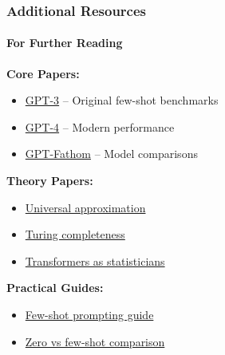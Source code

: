 \documentclass[10pt,aspectratio=169]{beamer}
\begin{document}
\begin{frame}
\frametitle{Additional Resources}
\framesubtitle{For Further Reading}

\textbf{Core Papers:}
\begin{itemize}
    \item \href{run:./papers/2005.14165_gpt3_language_models_few_shot.pdf}{\color{blue}GPT-3} -- Original few-shot benchmarks
    \item \href{run:./papers/2303.08774_gpt4_technical_report.pdf}{\color{blue}GPT-4} -- Modern performance
    \item \href{run:./papers/2309.16583_gpt_fathom.pdf}{\color{blue}GPT-Fathom} -- Model comparisons
\end{itemize}

\vspace{0.5cm}
\textbf{Theory Papers:}
\begin{itemize}
    \item \href{run:./papers/1912.10077_universal_approximators.pdf}{\color{blue}Universal approximation}
    \item \href{run:./papers/1901.03429_turing_completeness.pdf}{\color{blue}Turing completeness}
    \item \href{run:./papers/2306.04637_transformers_statisticians.pdf}{\color{blue}Transformers as statisticians}
\end{itemize}

\vspace{0.5cm}
\textbf{Practical Guides:}
\begin{itemize}
    \item \href{run:./papers/prompthub_few_shot_guide.md}{\color{blue}Few-shot prompting guide}
    \item \href{run:./papers/analytics_vidhya_comparison.md}{\color{blue}Zero vs few-shot comparison}
\end{itemize}
\end{frame}
\end{document}
